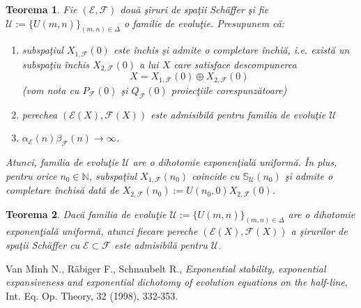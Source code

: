 \documentclass[ a4paper, 12pt]{report}
\newcommand{\E}{\mathcal{E}}
\newcommand{\F}{\mathcal{F}}
\newcommand{\N}{\mathbb{N}}
\newtheorem{theorem}{\bf Teorema}[section]
\theoremstyle{definition}
\theoremstyle{remark}
\numberwithin{equation}{section}
\begin{document}
\begin{theorem}
\label{artC:mainthm}
Fie $(\E,\F)$ dou\u a \c siruri de spa\c tii Sch\"{a}ffer \c si fie \\ $\mathcal{U}:=\{U(m,n)\}_{(m,n)\in\Delta}$ o familie de evolu\c tie.
Presupunem c\u a:
\begin{enumerate}
\item[$(h_1)$] subspa\c tiul $X_{1,\F}(0)$ este \^inchis \c si admite o completare \^inchi\u a,
 i.e. exist\u a un subspa\c tiu \^inchis $X_{2,\F}(0)$ a lui $X$ care satisface descompunerea
 $$X=X_{1,\F}(0)\oplus X_{2,\F}(0)$$
 (vom nota cu $P_{\F}(0)$ \c si $Q_{\F}(0)$ proiec\c tiile corespunz\u atoare)
\item[$(h_2)$] perechea $(\E(X),\F(X))$ este admisibil\u a pentru familia de evolu\c tie $\mathcal{U}$
\item[$(h_3)$] $\alpha_{\E}(n)\beta_{\F}(n) \to\infty$.
\end{enumerate}
Atunci, familia de evolu\c tie $\mathcal{U}$ are o dihotomie exponen\c tial\u a uniform\u a. \^In plus,
pentru orice $n_0\in\N$, subspa\c tiul $X_{1,\F}(n_0)$ coincide cu $\mathbb{S}_{\mathcal{U}}(n_0)$
\c si admite o completare \^inchis\u a dat\u a de  $X_{2,\F}(n_0):=U(n_0,0)X_{2,\F}(0)$.
\end{theorem}


\begin{theorem}
\label{artC:conversemainthm}
Dac\u a familia de evolu\c tie $\mathcal{U}:=\{U(m,n)\}_{(m,n)\in\Delta}$ are o dihotomie exponen\c tial\u a uniform\u a, atunci
fiecare pereche $(\E(X),\F(X))$ a \c sirurilor de spa\c tii Sch\"{a}ffer cu $\E\subset\F$
este admisibil\u a pentru $\mathcal{U}$.
\end{theorem}



\begin{thebibliography}{}

Van Minh N., R\"{a}biger F., Schnaubelt R.,
\emph{Exponential stability, exponential expansiveness and exponential
dichotomy of evolution equations on the half-line}, Int. Eq. Op. Theory, 32 (1998), 332-353.


\end{thebibliography}{}
\end{document}
